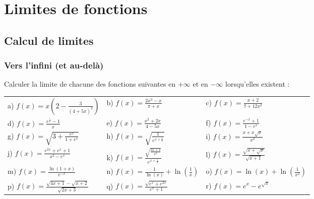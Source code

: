 \documentclass[oneside,12pt]{book}          %
\begin{document}

\chapter{Limites de fonctions}
\newpage

\section{Calcul de limites}

\subsection{Vers l'infini (et au-delà)}
Calculer la limite de chacune des fonctions suivantes en $+\infty$ et en $-\infty$ lorsqu'elles existent :\\
\renewcommand{\arraystretch}{1.7}
\begin{tabular}{p{} p{} p{}}
    a) $f(x)=x\left(2-\frac{3}{(4+5x)^2}\right)$ & b) $f(x)=\frac{2x^3-x}{\pi+x}$ & c) $f(x)=\frac{x+2}{7+12x^2}$ \\
    d) $f(x)=\frac{e^{\frac{1}{x}}-1}{x}$ & e) $f(x)=\frac{x^2+2x}{4-5x}$ & f) $f(x)=\frac{e^{-x}+1}{1-e^x}$\\[5pt]
    g) $f(x)=\sqrt{3+\frac{e^x}{1+e^x}}$ & h) $f(x)=\sqrt{\frac{1}{e^{x+\frac{1}{x}}}}$ & i) $f(x)=\frac{x+x\sqrt{x}}{x^2}$ \\[10pt]
    j) $f(x)=\frac{e^{2x}+e^x+1}{x^2-e^x}$ & k) $f(x)=\frac{\sqrt{\frac{3x+4}{x^2}}}{e^{x+\frac{1}{x}}}$ & l) $f(x)=\frac{\sqrt{x+\sqrt{x}}}{\sqrt{x+1}}$ \\
m) $f(x)=\frac{\ln(1+x)}{e^{-x}}$ & n) $f(x)=\frac{1}{\ln(x)}+\ln\left(\frac{1}{x}\right)$ & o) $f(x)=\ln(x)+\ln\left(\frac{1}{x^2}\right)$\\
p) $f(x)=\frac{\sqrt{4x+1}-\sqrt{x+2}}{\sqrt{2x+3}}$ & q) $f(x)=\frac{\sqrt{e^x+e^{2x}}}{e^x+1}$ & r) $f(x)=e^x-e^{\sqrt{x}}$
\end{tabular}
\end{document}
